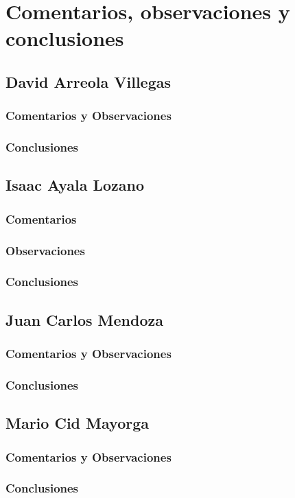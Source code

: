 \section{Comentarios, observaciones y conclusiones}
\subsection{David Arreola Villegas}
\subsubsection{Comentarios y Observaciones}

\subsubsection{Conclusiones}

\subsection{Isaac Ayala Lozano}
\subsubsection{Comentarios}

\subsubsection{Observaciones}

\subsubsection{Conclusiones}

\subsection{Juan Carlos Mendoza}
\subsubsection{Comentarios y Observaciones}

\subsubsection{Conclusiones}

\subsection{Mario Cid Mayorga}
\subsubsection{Comentarios y Observaciones}

\subsubsection{Conclusiones}
